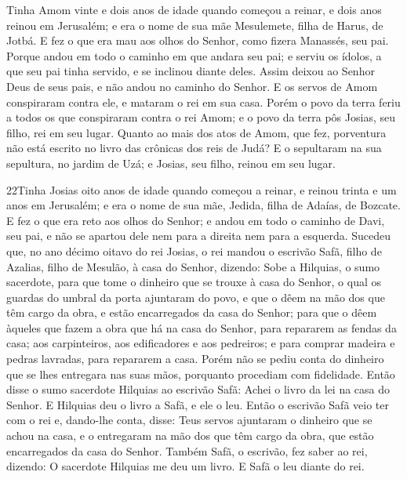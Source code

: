 Tinha Amom vinte e dois anos de idade quando começou a reinar, e
dois anos reinou em Jerusalém; e era o nome de sua mãe Mesulemete,
filha de Harus, de Jotbá. E fez o que era mau aos olhos do
Senhor, como fizera Manassés, seu pai. Porque andou em todo o
caminho em que andara seu pai; e serviu os ídolos, a que seu pai
tinha servido, e se inclinou diante deles. Assim deixou ao
Senhor Deus de seus pais, e não andou no caminho do Senhor. E
os servos de Amom conspiraram contra ele, e mataram o rei em sua
casa. Porém o povo da terra feriu a todos os que conspiraram
contra o rei Amom; e o povo da terra pôs Josias, seu filho, rei em
seu lugar. Quanto ao mais dos atos de Amom, que fez,
porventura não está escrito no livro das crônicas dos reis de Judá?
E o sepultaram na sua sepultura, no jardim de Uzá; e Josias,
seu filho, reinou em seu lugar.

\medskip

\lettrine{22} Tinha Josias oito anos de idade quando começou a
reinar, e reinou trinta e um anos em Jerusalém; e era o nome de sua
mãe, Jedida, filha de Adaías, de Bozcate. E fez o que era reto
aos olhos do Senhor; e andou em todo o caminho de Davi, seu pai, e
não se apartou dele nem para a direita nem para a esquerda.
Sucedeu que, no ano décimo oitavo do rei Josias, o rei mandou o
escrivão Safã, filho de Azalias, filho de Mesulão, à casa do Senhor,
dizendo: Sobe a Hilquias, o sumo sacerdote, para que tome o
dinheiro que se trouxe à casa do Senhor, o qual os guardas do umbral
da porta ajuntaram do povo, e que o dêem na mão dos que têm
cargo da obra, e estão encarregados da casa do Senhor; para que o
dêem àqueles que fazem a obra que há na casa do Senhor, para
repararem as fendas da casa; aos carpinteiros, aos edificadores
e aos pedreiros; e para comprar madeira e pedras lavradas, para
repararem a casa. Porém não se pediu conta do dinheiro que se
lhes entregara nas suas mãos, porquanto procediam com fidelidade.
Então disse o sumo sacerdote Hilquias ao escrivão Safã: Achei o
livro da lei na casa do Senhor. E Hilquias deu o livro a Safã, e ele
o leu. Então o escrivão Safã veio ter com o rei e, dando-lhe
conta, disse: Teus servos ajuntaram o dinheiro que se achou na casa,
e o entregaram na mão dos que têm cargo da obra, que estão
encarregados da casa do Senhor. Também Safã, o escrivão, fez
saber ao rei, dizendo: O sacerdote Hilquias me deu um livro. E Safã
o leu diante do rei.

